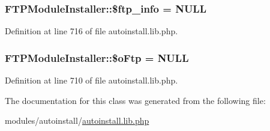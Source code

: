 \subsubsection[{\$ftp\+\_\+info}]{\setlength{\rightskip}{0pt plus 5cm}F\+T\+P\+Module\+Installer\+::\$ftp\+\_\+info = N\+U\+L\+L}\label{classFTPModuleInstaller_afd92e3672f27df9d0056f759cfb4206c}


Definition at line 716 of file autoinstall.\+lib.\+php.

\hypertarget{classFTPModuleInstaller_a7df6cf65240fbb39a7d763e10b236dc9}{}
\subsubsection[{\$o\+Ftp}]{\setlength{\rightskip}{0pt plus 5cm}F\+T\+P\+Module\+Installer\+::\$o\+Ftp = N\+U\+L\+L}\label{classFTPModuleInstaller_a7df6cf65240fbb39a7d763e10b236dc9}


Definition at line 710 of file autoinstall.\+lib.\+php.



The documentation for this class was generated from the following file\+:\begin{DoxyCompactItemize}
\item 
modules/autoinstall/\hyperlink{autoinstall_8lib_8php}{autoinstall.\+lib.\+php}\end{DoxyCompactItemize}
